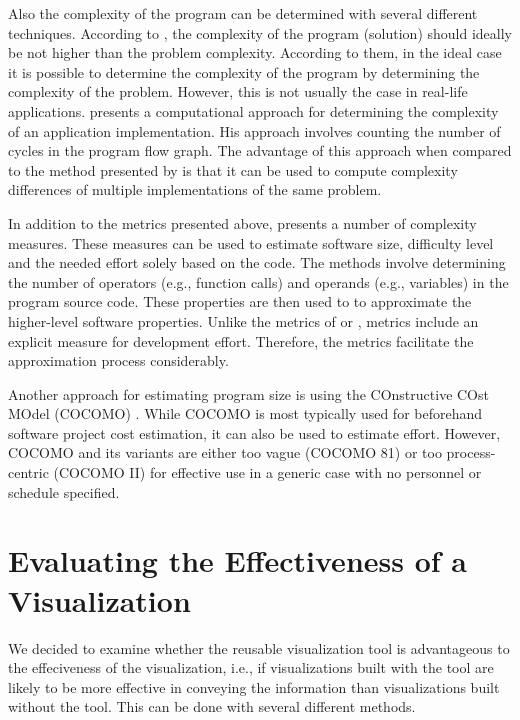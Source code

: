 Also the complexity of the program can be determined with several different techniques. According to \citet{fenton_software_1998}, the complexity of the program (solution) should ideally be not higher than the problem complexity. According to them, in the ideal case it is possible to determine the complexity of the program by determining the complexity of the problem. However, this is not usually the case in real-life applications. \citet{mccabe_complexity_1976} presents a computational approach for determining the complexity of an application implementation. His approach involves counting the number of cycles in the program flow graph. The advantage of this approach when compared to the method presented by \citet{fenton_software_1998} is that it can be used to compute complexity differences of multiple implementations of the same problem.

In addition to the metrics presented above, \citet{halstead_elements_1977} presents a number of complexity measures. These measures can be used to estimate software size, difficulty level and the needed effort solely based on the code. The methods involve determining the number of operators (e.g., function calls) and operands (e.g., variables) in the program source code. These properties are then used to to approximate the higher-level software properties. Unlike the metrics of \citeauthor{mccabe_complexity_1976} or \citeauthor{fenton_software_1998}, \citeauthor{halstead_elements_1977} metrics include an explicit measure for development effort. Therefore, the metrics facilitate the approximation process considerably.

Another approach for estimating program size is using the COnstructive COst MOdel (COCOMO) \citep{boehm_software_1981}. While COCOMO is most typically used for beforehand software project cost estimation, it can also be used to estimate effort. However, COCOMO and its variants are either too vague (COCOMO 81) or too process-centric (COCOMO II) for effective use in a generic case with no personnel or schedule specified. 

\section{Evaluating the Effectiveness of a Visualization}

We decided to examine whether the reusable visualization tool is advantageous to the effeciveness of the visualization, i.e., if visualizations built with the tool are likely to be more effective in conveying the information than visualizations built without the tool. This can be done with several different methods. 

